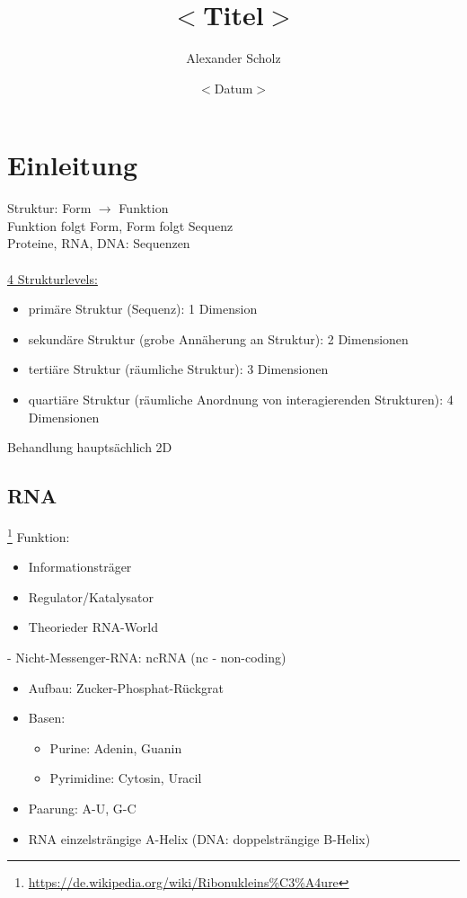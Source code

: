 \documentclass[12pt,a4paper]{article}
\title{\Huge\textbf{$<$Titel$>$}}
\author{Alexander Scholz}
\date{$<$Datum$>$}
\begin{document}
\begin{titlepage}

\maketitle
\thispagestyle{empty}
\end{titlepage}

\section{Einleitung}

Struktur: Form $\rightarrow$ Funktion\\
Funktion folgt Form, Form folgt Sequenz\\
Proteine, RNA, DNA: Sequenzen\\
\\
\underline{4 Strukturlevels:}
\begin{itemize}
	\item primäre Struktur (Sequenz): 1 Dimension
	\item sekundäre Struktur (grobe Annäherung an Struktur): 2 Dimensionen
	\item tertiäre Struktur (räumliche Struktur): 3 Dimensionen
	\item quartiäre Struktur (räumliche Anordnung von interagierenden Strukturen): 4 Dimensionen
\end{itemize}

Behandlung hauptsächlich 2D\\

% 
\subsection{RNA}\footnote{\url{https://de.wikipedia.org/wiki/Ribonukleins\%C3\%A4ure}}
Funktion:
\begin{itemize}
	\item Informationsträger
	\item Regulator/Katalysator
	\item Theorieder RNA-World
\end{itemize}

 - Nicht-Messenger-RNA: ncRNA (nc - non-coding)\\

\begin{itemize}
	\item Aufbau: Zucker-Phosphat-Rückgrat
	\item Basen:
	\begin{itemize}
		\item Purine: Adenin, Guanin
		\item Pyrimidine: Cytosin, Uracil
	\end{itemize}
	\item Paarung: A-U, G-C
	\item RNA einzelsträngige A-Helix (DNA: doppelsträngige B-Helix)
\end{itemize}
\end{document}
